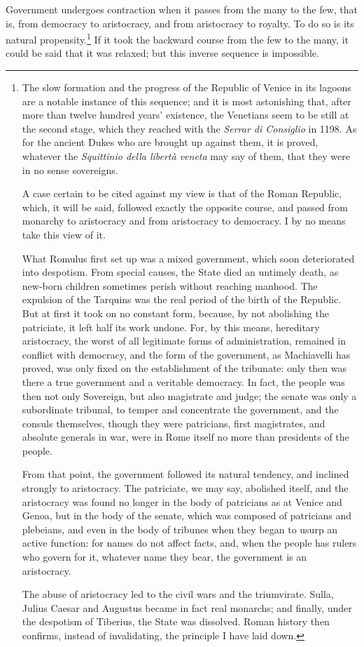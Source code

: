 \documentclass[12pt]{book}
\begin{document}
Government undergoes contraction when it passes from the many to the few, that is, from democracy to aristocracy, and from aristocracy to royalty. To do so is its natural propensity.\footnote{The slow formation and the progress of the Republic of Venice in its lagoons are a notable instance of this sequence; and it is most astonishing that, after more than twelve hundred years' existence, the Venetians seem to be still at the second stage, which they reached with the \textit{Serrar di Consiglio} in 1198. As for the ancient Dukes who are brought up against them, it is proved, whatever the \textit{Squittinio della libertà veneta} may say of them, that they were in no sense sovereigns.

A case certain to be cited against my view is that of the Roman Republic, which, it will be said, followed exactly the opposite course, and passed from monarchy to aristocracy and from aristocracy to democracy. I by no means take this view of it.

What Romulus first set up was a mixed government, which soon deteriorated into despotism. From special causes, the State died an untimely death, as new-born children sometimes perish without reaching manhood. The expulsion of the Tarquins was the real period of the birth of the Republic. But at first it took on no constant form, because, by not abolishing the patriciate, it left half its work undone. For, by this means, hereditary aristocracy, the worst of all legitimate forms of administration, remained in conflict with democracy, and the form of the government, as Machiavelli has proved, was only fixed on the establishment of the tribunate: only then was there a true government and a veritable democracy. In fact, the people was then not only Sovereign, but also magistrate and judge; the senate was only a subordinate tribunal, to temper and concentrate the government, and the consuls themselves, though they were patricians, first magistrates, and absolute generals in war, were in Rome itself no more than presidents of the people.

From that point, the government followed its natural tendency, and inclined strongly to aristocracy. The patriciate, we may say, abolished itself, and the aristocracy was found no longer in the body of patricians as at Venice and Genoa, but in the body of the senate, which was composed of patricians and plebeians, and even in the body of tribunes when they began to usurp an active function: for names do not affect facts, and, when the people has rulers who govern for it, whatever name they bear, the government is an aristocracy.

The abuse of aristocracy led to the civil wars and the triumvirate. Sulla, Julius Caesar and Augustus became in fact real monarchs; and finally, under the despotism of Tiberius, the State was dissolved. Roman history then confirms, instead of invalidating, the principle I have laid down.} If it took the backward course from the few to the many, it could be said that it was relaxed; but this inverse sequence is impossible.
\end{document}
